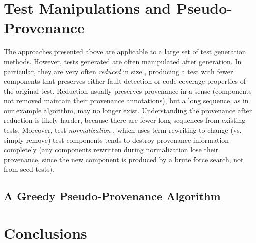\documentclass[final]{article}
\begin{document}
\section{Test Manipulations and Pseudo-Provenance}

The approaches presented above are applicable to a large set of test
generation methods.  However, tests generated are often manipulated
after generation.  In particular, they are very often \emph{reduced}
in size \cite{DD}, producing a test with fewer components that
preserves either fault detection or code coverage \cite{icst2014}
properties of the original test.  Reduction usually preserves
provenance in a sense (components not removed maintain their
provenance annotations), but a long sequence, as in our example
algorithm, may no longer exist.  Understanding the provenance after
reduction is likely harder, because there are fewer long sequences
from existing tests.  Moreover, test \emph{normalization} \cite{Groce:2017:OTR:3092703.3092704}, which uses
term rewriting to change (vs. simply remove) test components tends to
destroy provenance information completely (any components rewritten
during normalization
lose their provenance, since the new component is produced by a brute
force search, not from seed tests).

\subsection{A Greedy Pseudo-Provenance Algorithm}

\section{Conclusions}





\end{document}
